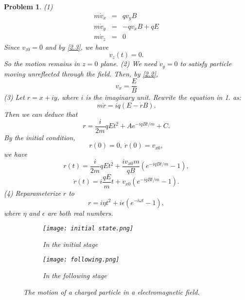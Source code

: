 \documentclass{article}
\theoremstyle{1}
\newtheorem{problem}{Problem}
\begin{document}
\begin{problem}
(1)
            \begin{eqnarray}
                m\dot{v}_x&=&qv_yB\\
                m\dot{v}_y&=&-qv_xB+qE\\\label{2.2}
                m\dot{v}_z&=&0\label{2.3}
            \end{eqnarray}
    Since $v_{z0}=0$ and by \eqref{2.3}, we have
    \begin{equation}
        v_z(t)=0.
    \end{equation}
    So the motion remains in $z= 0$ plane.
\newline
(2) We need $\dot{v}_y=0$ to satisfy particle moving unreflected through the field. Then, by \eqref{2.2},
\begin{equation}
    v_x=\frac{E}{B}
\end{equation}
\newline
(3) Let $r=x+iy$, where $i$ is the imaginary unit. Rewrite the equation in 1. as:
\begin{equation}
    m\ddot{r}=iq(E-\dot{r}B).
\end{equation}
Then we can deduce that 
\begin{equation}
    r=\frac{i}{2m}qEt^2+Ae^{-iqBt/m}+C.
\end{equation}
By the initial condition,
\begin{equation}
    r(0)=0,\ \dot{r}(0)=v_{x0},
\end{equation}
we have
\begin{equation}
    r(t)=\frac{i}{2m}qEt^2+\frac{iv_{x0}m}{qB}\left( e^{-iqBt/m}-1\right),
\end{equation}
\begin{equation}
    \dot{r}(t)=i\frac{qE}{m}t+v_{x0}\left(e^{-iqBt/m}-1\right).
\end{equation}
(4) Reparameterize $r$ to 
\begin{equation}
    r=i\eta t^2+i\epsilon \left( e^{-i\omega t}-1\right),
\end{equation}
where $\eta$ and $\epsilon$ are both real numbers.
\begin{figure}[htbp]
    \centering
    \begin{subfigure}{0.45\textwidth}
        \centering
        \texttt{[image: initial state.png]}
        \caption{In the initial stage}
        \label{fig:sub1}
    \end{subfigure}
    \hfill %
    \begin{subfigure}{0.45\textwidth}
        \centering
        \texttt{[image: following.png]}
        \caption{In the following stage}
        \label{fig:sub2}
    \end{subfigure}
    \caption{The motion of a charged particle in a electromagnetic field.}
    \label{fig:main}
\end{figure}

\end{problem}
\end{document}
